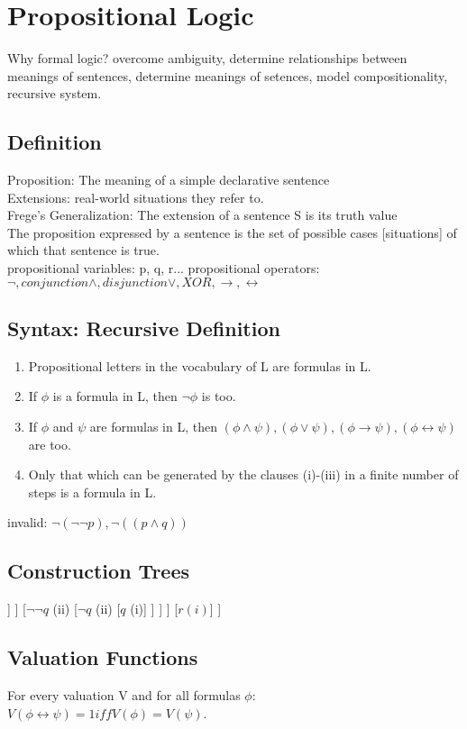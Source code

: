 \section{Propositional Logic}
Why formal logic? overcome ambiguity, determine relationships between meanings of sentences, determine meanings of setences, model compositionality, recursive system.

\subsection*{Definition}
Proposition: The meaning of a simple declarative sentence \\
Extensions: real-world situations they refer to. \\
Frege’s Generalization: The extension of a sentence S is its truth value \\
The proposition expressed by a sentence is the set of possible cases [situations] of which that sentence is true. \\
propositional variables: p, q, r...
propositional operators: $\neg, conjunction \land, disjunction \lor, XOR, \to, \leftrightarrow$

\subsection*{Syntax: Recursive Definition}
\begin{enumerate}
\item Propositional letters in the vocabulary of L are formulas in L.
\item If $\phi$ is a formula in L, then $\neg \phi$ is too.
\item If $\phi$ and $\psi$ are formulas in L, then $(\phi \land \psi), (\phi \lor \psi), (\phi \to \psi), (\phi \leftrightarrow \psi)$ are too.
\item Only that which can be generated by the clauses (i)-(iii) in a finite
number of steps is a formula in L.
\end{enumerate}
invalid: $\neg (\neg \neg p), \neg ((p \land q))$ \\

\subsection*{Construction Trees}
\begin{forest}
[$(\neg (p \lor q) \to \neg \neg q) \leftrightarrow r$ $(iii. \leftrightarrow)$
	[$(\neg (p \lor q) \to \neg \neg q)$ $(iii. \to)$
		[$\neg (p \lor q)$ $(ii)$
			[$p \lor q$ $(iii. \lor)$
				[$p$ (i)]
				[$q$ (i)]
			]			
		]
		[$\neg \neg q$ (ii)
			[$\neg q$ (ii)
				[$q$ (i)]
			]
		]
	]
	[$r(i)$]
]
\end{forest}

\subsection*{Valuation Functions}
For every valuation V and for all formulas $\phi$: \\
$V(\phi \leftrightarrow \psi) = 1 iff V(\phi) = V(\psi)$.

